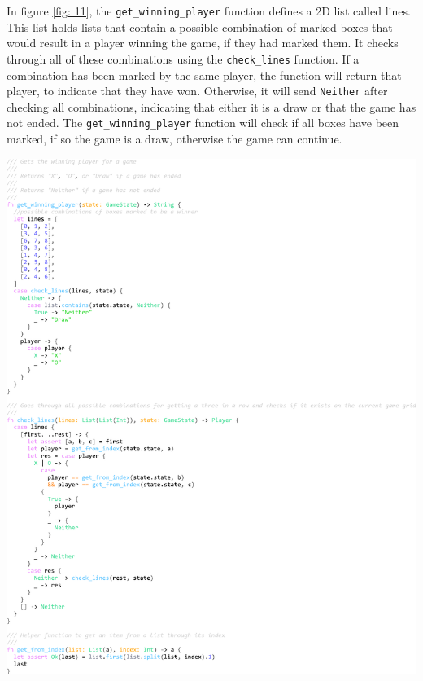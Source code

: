 \documentclass[]{final}
\begin{document}
\newpage

\begin{minipage}[t]{18em}
  In figure \ref{fig: 11}, the \lstinline|get_winning_player| function defines a
  2D list called lines. This list holds lists that contain a possible combination
  of marked boxes that would result in a player winning the game, if they had marked them.
  It checks through all of these combinations using the \lstinline|check_lines| function.
  If a combination has been marked by the same player, the function will return that player,
  to indicate that they have won. Otherwise, it will send \lstinline|Neither| after checking all
  combinations, indicating that either it is a draw or that the game has not ended.
  The \lstinline|get_winning_player| function will check if all boxes have been marked,
  if so the game is a draw, otherwise the game can continue.
\end{minipage}
\hfill
\begin{minipage}[t]{20em}
  \includegraphics[width=\textwidth]{winning.pdf}
  \label{fig: 11}
\end{minipage}
\end{document}
